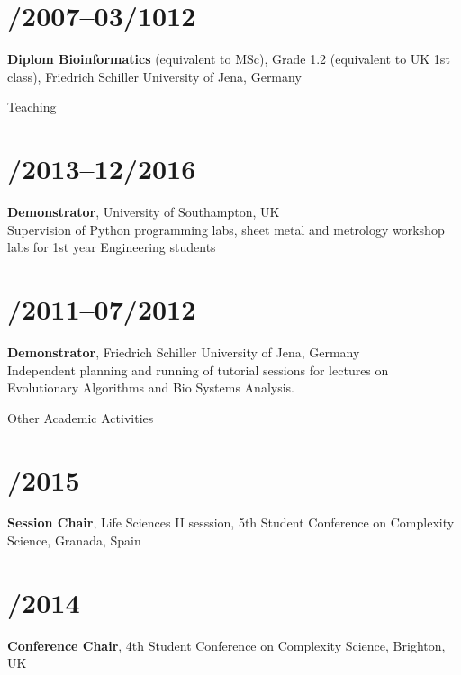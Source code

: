 \documentclass[margin,line,10pt]{res}
\begin{document}
\begin{resume}
\section{/2007--03/1012}{\bf Diplom Bioinformatics} (equivalent to MSc), Grade 1.2 (equivalent to UK 1st class), Friedrich Schiller University of Jena, Germany\\ 

\vspace*{-.2in}

\newpage

{\sc Teaching}\\
\vspace*{-.35in}
\section{/2013--12/2016}{\bf Demonstrator}, University of Southampton, UK\\
Supervision of Python programming labs, sheet metal and metrology workshop labs for 1st year Engineering students\\
\vspace*{-.35in}
\section{/2011--07/2012}{\bf Demonstrator}, Friedrich Schiller University of Jena, Germany\\
Independent planning and running of tutorial sessions for lectures on Evolutionary Algorithms and Bio Systems Analysis.\\

\vspace*{-.2in}

{\sc Other Academic Activities}\\
\vspace*{-.35in}
\section{/2015}{\bf Session Chair}, Life Sciences II sesssion, 5th Student Conference on Complexity Science, Granada, Spain\\
\vspace*{-.35in}
\section{/2014}{\bf Conference Chair}, 4th Student Conference on Complexity Science, Brighton, UK\\


\end{resume}
\end{document}
